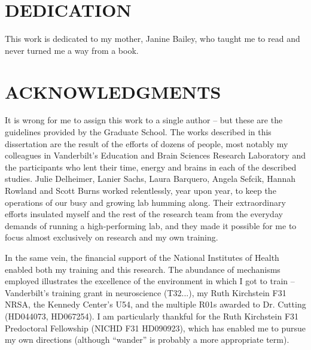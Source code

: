 \documentclass[12pt]{report}  %
\begin{document}
\doublespacing
{} \setcounter{page}{1}

\chapter*{DEDICATION}
\vspace{7mm}

This work is dedicated to my mother, Janine Bailey, who taught me to read and never turned me a way from a book. 

\chapter*{ACKNOWLEDGMENTS}
\vspace{7mm}


It is wrong for me to assign this work to a single author -- but these are the guidelines provided by the Graduate School. The works described in this dissertation are the result of the efforts of dozens of people, most notably my colleagues in Vanderbilt's Education and Brain Sciences Research Laboratory and the participants who lent their time, energy and brains in each of the described studies. Julie Delheimer, Lanier Sachs, Laura Barquero, Angela Sefcik, Hannah Rowland and Scott Burns worked relentlessly, year upon year, to keep the operations of our busy and growing lab humming along. Their extraordinary efforts insulated myself and the rest of the research team from the everyday demands of running a high-performing lab, and they made it possible for me to focus almost exclusively on research and my own training. 

In the same vein, the financial support of the National Institutes of Health enabled both my training and this research. The abundance of mechanisms employed illustrates the excellence of the environment in which I got to train -- Vanderbilt's training grant in neuroscience (T32...), my Ruth Kirchstein F31 NRSA, the Kennedy Center's U54, and the multiple R01s awarded to Dr. Cutting (HD044073, HD067254). I am particularly thankful for the Ruth Kirchstein F31 Predoctoral Fellowship (NICHD F31 HD090923), which has enabled me to pursue my own directions (although ``wander'' is probably a more appropriate term).
\end{document}
